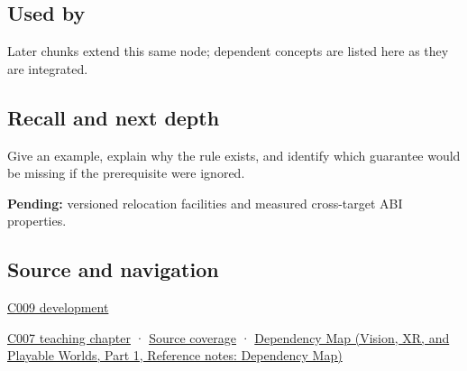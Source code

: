 \subsection{Used by}\label{appendix-958870a64c53-used-by}

\hypertarget{appendix-958870a64c53-used-by}{}

Later chunks extend this same node; dependent concepts are listed here as they are integrated.

\subsection{Recall and next depth}\label{appendix-958870a64c53-recall-and-next-depth}

\hypertarget{appendix-958870a64c53-recall-and-next-depth}{}

Give an example, explain why the rule exists, and identify which guarantee would be missing if the prerequisite were ignored.

\textbf{Pending:} versioned relocation facilities and measured cross-target ABI properties.

\subsection{Source and navigation}\label{appendix-958870a64c53-source-and-navigation}

\hypertarget{appendix-958870a64c53-source-and-navigation}{}

\hyperref[appendix-fd090d982a15-m009---parts-127-147]{C009 development}

\hyperref[01-foundations-i-ch003-bringing-the-object-model-back-to-bytes]{C007 teaching chapter} · \hyperref[appendix-fd090d982a15-m007---parts-101-112]{Source coverage} · \href{../07-Vision-XR-and-Playable-Worlds-P01/main.pdf\#appendix-4ad47bdd269a}{Dependency Map (Vision, XR, and Playable Worlds, Part 1, Reference notes: Dependency Map)}
